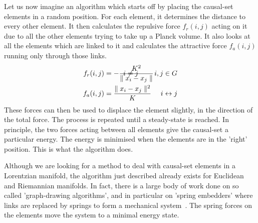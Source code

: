 \documentclass[a4paper,12pt]{article}
\numberwithin{equation}{section}
\begin{document}
Let us now imagine an algorithm which starts off by placing the causal-set elements in a random position. For each element, it determines the distance to every other element. It then calculates the repulsive force $f_r(i, j)$ acting on it due to all the other elements trying to take up a Planck volume. It also looks at all the elements which are linked to it and calculates the attractive force $f_a(i, j)$ running only through those links. 
\begin{subequations}
\label{eq:Forces}
\begin{align}
f_r(i, j) & = -\frac{K^2}{\parallel x_i - x_j\parallel} & \hspace{-24mm} i \neq j \hspace{8mm} i, j \in G \\
f_a(i, j) & = \frac{\parallel x_i - x_j\parallel^2}{K} & i \leftrightarrow j
\end{align}
\end{subequations}
These forces can then be used to displace the element slightly, in the direction of the total force. The process is repeated until a steady-state is reached. In principle, the two forces acting between all elements give the causal-set a particular energy. The energy is minimised when the elements are in the 'right' position. This is what the algorithm does.


Although we are looking for a method to deal with causal-set elements in a Lorentzian manifold, the algorithm just described already exists for Euclidean and Riemannian manifolds. In fact, there is a large body of work done on so called 'graph-drawing algorithms', and in particular on 'spring embedders' where links are replaced by springs to form a mechanical system~\cite{Kobourov2007}. The spring forces on the elements move the system to a minimal energy state.
\end{document}
